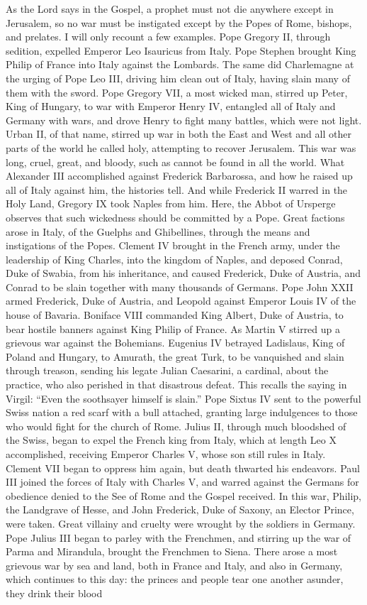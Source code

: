 As the Lord says in the Gospel, a prophet must not die anywhere except in Jerusalem, so no war must be instigated except by the Popes of Rome, bishops, and prelates. I will only recount a few examples. Pope Gregory II, through sedition, expelled Emperor Leo Isauricus from Italy. Pope Stephen brought King Philip of France into Italy against the Lombards. The same did Charlemagne at the urging of Pope Leo III, driving him clean out of Italy, having slain many of them with the sword. Pope Gregory VII, a most wicked man, stirred up Peter, King of Hungary, to war with Emperor Henry IV, entangled all of Italy and Germany with wars, and drove Henry to fight many battles, which were not light. Urban II, of that name, stirred up war in both the East and West and all other parts of the world he called holy, attempting to recover Jerusalem. This war was long, cruel, great, and bloody, such as cannot be found in all the world. What Alexander III accomplished against Frederick Barbarossa, and how he raised up all of Italy against him, the histories tell. And while Frederick II warred in the Holy Land, Gregory IX took Naples from him. Here, the Abbot of Ursperge observes that such wickedness should be committed by a Pope. Great factions arose in Italy, of the Guelphs and Ghibellines, through the means and instigations of the Popes. Clement IV brought in the French army, under the leadership of King Charles, into the kingdom of Naples, and deposed Conrad, Duke of Swabia, from his inheritance, and caused Frederick, Duke of Austria, and Conrad to be slain together with many thousands of Germans. Pope John XXII armed Frederick, Duke of Austria, and Leopold against Emperor Louis IV of the house of Bavaria. Boniface VIII commanded King Albert, Duke of Austria, to bear hostile banners against King Philip of France. As Martin V stirred up a grievous war against the Bohemians. Eugenius IV betrayed Ladislaus, King of Poland and Hungary, to Amurath, the great Turk, to be vanquished and slain through treason, sending his legate Julian Caesarini, a cardinal, about the practice, who also perished in that disastrous defeat. This recalls the saying in Virgil: “Even the soothsayer himself is slain.” Pope Sixtus IV sent to the powerful Swiss nation a red scarf with a bull attached, granting large indulgences to those who would fight for the church of Rome. Julius II, through much bloodshed of the Swiss, began to expel the French king from Italy, which at length Leo X accomplished, receiving Emperor Charles V, whose son still rules in Italy. Clement VII began to oppress him again, but death thwarted his endeavors. Paul III joined the forces of Italy with Charles V, and warred against the Germans for obedience denied to the See of Rome and the Gospel received. In this war, Philip, the Landgrave of Hesse, and John Frederick, Duke of Saxony, an Elector Prince, were taken. Great villainy and cruelty were wrought by the soldiers in Germany. Pope Julius III began to parley with the Frenchmen, and stirring up the war of Parma and Mirandula, brought the Frenchmen to Siena. There arose a most grievous war by sea and land, both in France and Italy, and also in Germany, which continues to this day: the princes and people tear one another asunder, they drink their blood 